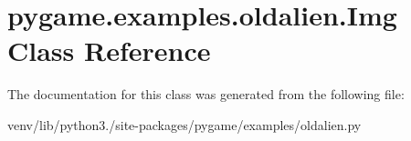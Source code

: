 \hypertarget{classpygame_1_1examples_1_1oldalien_1_1_img}{}\section{pygame.\+examples.\+oldalien.\+Img Class Reference}
\label{classpygame_1_1examples_1_1oldalien_1_1_img}


The documentation for this class was generated from the following file\+:\begin{DoxyCompactItemize}
\item 
venv/lib/python3./site-\/packages/pygame/examples/oldalien.\+py\end{DoxyCompactItemize}
